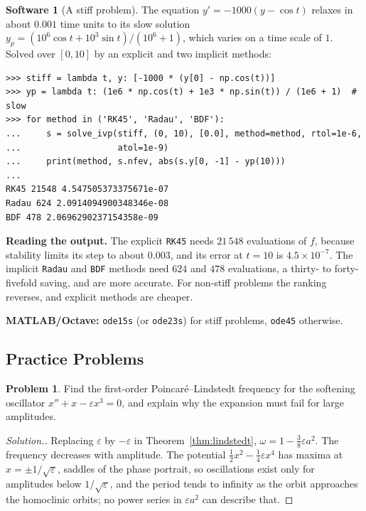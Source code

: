 \documentclass[11pt,a4paper]{article}
\numberwithin{equation}{section}
\theoremstyle{definition}
\newtheorem{software}[thm]{Software}
\newtheorem{problemx}{Problem}[subsection]
\newenvironment{problem}{\begin{problemx}}{\end{problemx}}
\newenvironment{solution}
  {\renewcommand{\qedsymbol}{}\begin{proof}[\textit{Solution}.]}
  {\end{proof}}
\begin{document}
\begin{software}[A stiff problem]
\label{sw:stiff}
The equation $y' = -1000(y - \cos t)$ relaxes in about $0.001$ time units to its slow solution $y_p = (10^6\cos t + 10^3\sin t)/(10^6 + 1)$, which varies on a time scale of $1$. Solved over $[0, 10]$ by an explicit and two implicit
methods:
{\small\begin{verbatim}
>>> stiff = lambda t, y: [-1000 * (y[0] - np.cos(t))]
>>> yp = lambda t: (1e6 * np.cos(t) + 1e3 * np.sin(t)) / (1e6 + 1)  # slow
>>> for method in ('RK45', 'Radau', 'BDF'):
...     s = solve_ivp(stiff, (0, 10), [0.0], method=method, rtol=1e-6,
...                   atol=1e-9)
...     print(method, s.nfev, abs(s.y[0, -1] - yp(10)))
...
RK45 21548 4.547505373375671e-07
Radau 624 2.0914094900348346e-08
BDF 478 2.0696290237154358e-09
\end{verbatim}}
\textbf{Reading the output.} The explicit \texttt{RK45} needs $21\,548$ evaluations of $f$, because stability limits its step to about $0.003$, and its error at $t = 10$ is $4.5 \times 10^{-7}$. The implicit \texttt{Radau} and
\texttt{BDF} methods need $624$ and $478$ evaluations, a thirty- to forty-fivefold saving, and are more accurate. For non-stiff problems the ranking reverses, and explicit methods are cheaper.

\textbf{MATLAB/Octave:} \texttt{ode15s} (or \texttt{ode23s}) for stiff problems, \texttt{ode45} otherwise.
\end{software}

\subsection{Practice Problems}

\begin{problem}
Find the first-order Poincar\'e--Lindstedt frequency for the softening oscillator $x'' + x - \varepsilon x^3 = 0$, and explain why the expansion must fail for large amplitudes.
\end{problem}

\begin{solution}
Replacing $\varepsilon$ by $-\varepsilon$ in Theorem~\ref{thm:lindstedt}, $\omega = 1 - \frac38\varepsilon a^2$. The frequency decreases with amplitude. The potential $\frac12x^2 - \frac14\varepsilon x^4$ has maxima at $x = \pm1/\sqrt\varepsilon$, saddles of the phase
portrait, so oscillations exist only for amplitudes below $1/\sqrt\varepsilon$, and the period tends to infinity as the orbit approaches the homoclinic orbits; no power series in $\varepsilon a^2$ can describe that.
\end{solution}
\end{document}
